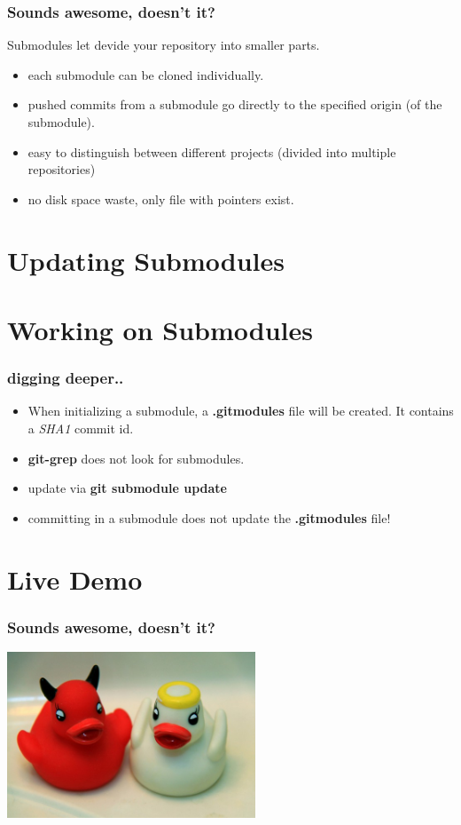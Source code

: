\documentclass[10pt]{beamer}
\begin{document}
\begin{frame}
	\frametitle{Sounds awesome, doesn't it?}
	Submodules let devide your repository into smaller parts.
	\begin{itemize}
		\item each submodule can be cloned individually.
		\item pushed commits from a submodule go directly to the specified origin (of the submodule).
		\item easy to distinguish between different projects (divided into multiple repositories)
		\item no disk space waste, only file with pointers exist.
	\end{itemize}
\end{frame}

\section{Updating Submodules}
\section{Working on Submodules}

\begin{frame}
	\frametitle{digging deeper..}
	\begin{itemize}
		\item When initializing a submodule, a \textbf{.gitmodules} file will be created. It contains a \emph{SHA1} commit id.
		\item \textbf{git-grep} does not look for submodules.
		\item update via \textbf{git submodule update}
		\item committing in a submodule does not update the \textbf{.gitmodules} file!
	\end{itemize}
\end{frame}

\section{Live Demo}

\begin{frame}
	\frametitle{Sounds awesome, doesn't it?}
\begin{center}\includegraphics[width=280px]{images/goodbad.jpg}\end{center}
\end{frame}
\end{document}
